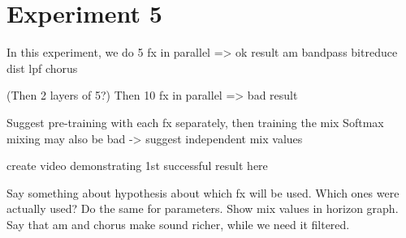 \section{Experiment 5}
In this experiment, we do 5 fx in parallel => ok result
am
bandpass
bitreduce
dist lpf
chorus

(Then 2 layers of 5?)
Then 10 fx in parallel => bad result

Suggest pre-training with each fx separately, then training the mix
Softmax mixing may also be bad -> suggest independent mix values

create video demonstrating 1st successful result here

Say something about hypothesis about which fx will be used. Which ones were actually used? Do the same for parameters. Show mix values in horizon graph. Say that am and chorus make sound richer, while we need it filtered.